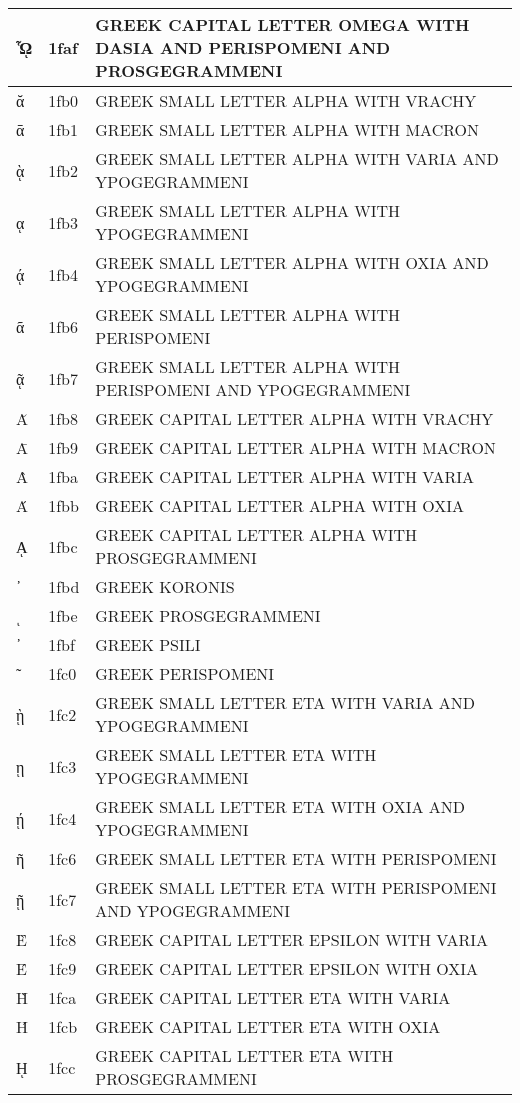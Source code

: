 \documentclass[12pt,letterpaper,openany]{book}
\begin{document}
\begin{center}
\begin{supertabular}{|m{0.25in}|m{0.5in}|m{4in}|}
ᾯ & 1faf & GREEK CAPITAL LETTER OMEGA WITH DASIA AND PERISPOMENI AND PROSGEGRAMMENI\\\hline
ᾰ & 1fb0 & GREEK SMALL LETTER ALPHA WITH VRACHY\\\hline
ᾱ & 1fb1 & GREEK SMALL LETTER ALPHA WITH MACRON\\\hline
ᾲ & 1fb2 & GREEK SMALL LETTER ALPHA WITH VARIA AND YPOGEGRAMMENI\\\hline
ᾳ & 1fb3 & GREEK SMALL LETTER ALPHA WITH YPOGEGRAMMENI\\\hline
ᾴ & 1fb4 & GREEK SMALL LETTER ALPHA WITH OXIA AND YPOGEGRAMMENI\\\hline
ᾶ & 1fb6 & GREEK SMALL LETTER ALPHA WITH PERISPOMENI\\\hline
ᾷ & 1fb7 & GREEK SMALL LETTER ALPHA WITH PERISPOMENI AND YPOGEGRAMMENI\\\hline
Ᾰ & 1fb8 & GREEK CAPITAL LETTER ALPHA WITH VRACHY\\\hline
Ᾱ & 1fb9 & GREEK CAPITAL LETTER ALPHA WITH MACRON\\\hline
Ὰ & 1fba & GREEK CAPITAL LETTER ALPHA WITH VARIA\\\hline
Ά & 1fbb & GREEK CAPITAL LETTER ALPHA WITH OXIA\\\hline
ᾼ & 1fbc & GREEK CAPITAL LETTER ALPHA WITH PROSGEGRAMMENI\\\hline
᾽ & 1fbd & GREEK KORONIS\\\hline
ι & 1fbe & GREEK PROSGEGRAMMENI\\\hline
᾿ & 1fbf & GREEK PSILI\\\hline
῀ & 1fc0 & GREEK PERISPOMENI\\\hline
ῂ & 1fc2 & GREEK SMALL LETTER ETA WITH VARIA AND YPOGEGRAMMENI\\\hline
ῃ & 1fc3 & GREEK SMALL LETTER ETA WITH YPOGEGRAMMENI\\\hline
ῄ & 1fc4 & GREEK SMALL LETTER ETA WITH OXIA AND YPOGEGRAMMENI\\\hline
ῆ & 1fc6 & GREEK SMALL LETTER ETA WITH PERISPOMENI\\\hline
ῇ & 1fc7 & GREEK SMALL LETTER ETA WITH PERISPOMENI AND YPOGEGRAMMENI\\\hline
Ὲ & 1fc8 & GREEK CAPITAL LETTER EPSILON WITH VARIA\\\hline
Έ & 1fc9 & GREEK CAPITAL LETTER EPSILON WITH OXIA\\\hline
Ὴ & 1fca & GREEK CAPITAL LETTER ETA WITH VARIA\\\hline
Ή & 1fcb & GREEK CAPITAL LETTER ETA WITH OXIA\\\hline
ῌ & 1fcc & GREEK CAPITAL LETTER ETA WITH PROSGEGRAMMENI\\\hline

\end{supertabular}
\end{center}
\end{document}
